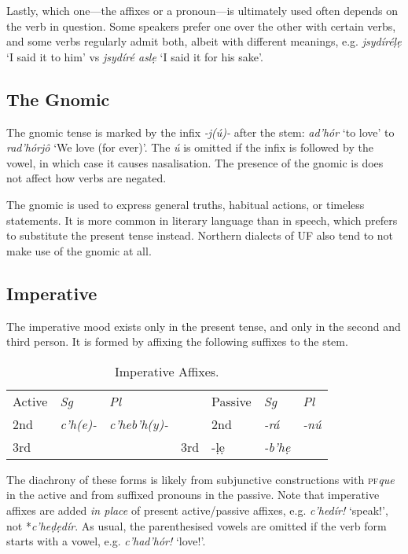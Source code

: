 \documentclass[a4paper, 12pt, twoside, openright, final]{book}
\def\pfabbr{{\normalfont\scshape pf\space}}
\def\pf#1{\pfabbr\textit{#1}}
\let \nf \normalfont
\let \w \textit
\begin{document}
Lastly, which one—the  affixes or a  pronoun—is ultimately used often depends on the verb in question. Some speakers prefer
one over the other with certain verbs, and some verbs regularly admit both, albeit with different meanings, e.g. \w{jsydíréḷẹ}
‘I said it to him’ vs \w{jsydíré aslẹ} ‘I said it for his sake’.

\subsection{The Gnomic}\label{subsubsec:gnomic}
The gnomic tense is marked by the infix \w{-j(ú)-} after the stem: \w{ad’hór} ‘to love’ to \w{rad’hórjô} ‘We love (for ever)’.
The \w{ú} is omitted if the infix is followed by the vowel, in which case it causes nasalisation. The presence of the gnomic
is does not affect how verbs are negated.

The gnomic is used to express general truths, habitual actions, or timeless statements. It is more common in
literary language than in speech, which prefers to substitute the present tense instead. Northern dialects
of UF also tend to not make use of the gnomic at all.

\subsection{Imperative}
The imperative mood exists only in the present tense, and only in the second and third person. It is formed by
affixing the following suffixes to the stem.
\begin{table}[H]
\centering
\noindent\begin{tabular}{l|>{\it}l|>{\it}lll|>{\it}l|>{\it}l}
 Active&\nf Sg&\nf Pl& & Passive&\nf Sg&\nf Pl\\\cline{1-3}\cline{5-7}
2nd &c’h(e)-     &c’heb’h(y)- &&2nd& -rá   &-nú\\\cline{1-3}\cline{5-7}
3rd &\multicolumn{2}{c}{\it c’hel(ẹ)-} &&3rd& -ḷẹ   &-b’hẹ\\
\end{tabular}
\caption{Imperative Affixes.}\label{tab:imperative-affixes}
\end{table}

\noindent The diachrony of these forms is likely from subjunctive constructions with \pf{que} in the active
and from suffixed pronouns in the passive. Note that imperative affixes are added \textit{in place} of
present active/passive affixes, e.g. \w{c’hedír!} ‘speak!’, not *\w{c’heḍẹdír}. As usual, the parenthesised
vowels are omitted if the verb form starts with a vowel, e.g. \w{c’had’hór!} ‘love!’.
\end{document}

